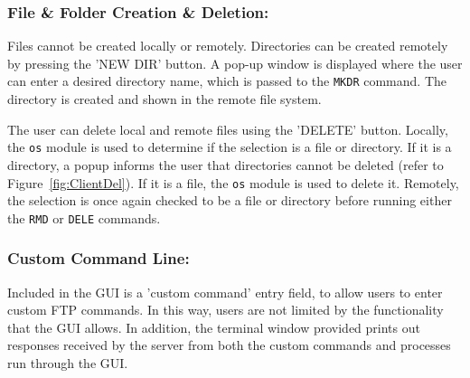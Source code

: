 \documentclass[10pt,twocolumn]{witseiepaper}
\begin{document}
\vspace*{-2mm}
\subsubsection*{File \& Folder Creation \& Deletion: }
Files cannot be created locally or remotely. Directories can be created remotely by pressing the 'NEW DIR' button. A pop-up window is displayed where the user can enter a desired directory name, which is passed to the \texttt{MKDR} command. The directory is created and shown in the remote file system. 

The user can delete local and remote files using the 'DELETE' button. Locally, the \texttt{os} module is used to determine if the selection is a file or directory. If it is a directory, a popup informs the user that directories cannot be deleted (refer to Figure~\ref{fig:ClientDel}). If it is a file, the \texttt{os} module is used to delete it. Remotely, the selection is once again checked to be a file or directory before running either the \texttt{RMD} or \texttt{DELE} commands.

\vspace*{-2mm}
\subsubsection*{Custom Command Line: }
Included in the GUI is a 'custom command' entry field, to allow users to enter custom FTP commands. In this way, users are not limited by the functionality that the GUI allows. In addition, the terminal window provided prints out responses received by the server from both the custom commands and processes run through the GUI.



\end{document}
